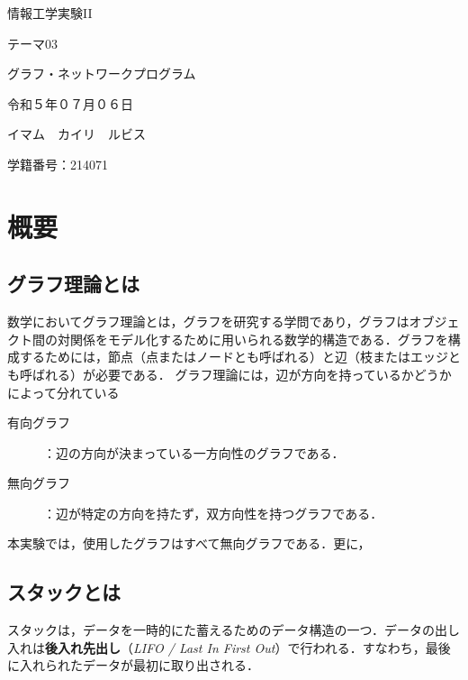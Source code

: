 \documentclass[a4j, titlepage]{jarticle}
\begin{document}
  \begin{center}
  \huge 情報工学実験II\par
  \vspace{15mm}
  \huge テーマ03 \par
  \huge グラフ・ネットワークプログラム \par
  \vspace{15mm}
  \vspace{20mm}
  \vspace{100mm}
  \Large 令和５年０７月０６日 \par
  \vspace{15mm}
  \Large イマム　カイリ　ルビス \par
  \vspace{10mm}
  \Large 学籍番号：214071\par
  \vspace{10mm}
\end{center}
\clearpage

\tableofcontents
\clearpage

\section{概要}
    \subsection{グラフ理論とは}
    数学においてグラフ理論とは，グラフを研究する学問であり，グラフはオブジェクト間の対関係をモデル化するために用いられる数学的構造である．グラフを構成するためには，節点（点またはノードとも呼ばれる）と辺（枝またはエッジとも呼ばれる）が必要である\cite{bib:wikigraph}． 
    グラフ理論には，辺が方向を持っているかどうかによって分れている
    \begin{description}
        \item[有向グラフ]：辺の方向が決まっている一方向性のグラフである．
        \item[無向グラフ]：辺が特定の方向を持たず，双方向性を持つグラフである．
    \end{description}
    本実験では，使用したグラフはすべて無向グラフである．更に，

    \subsection{スタックとは} 
    スタックは，データを一時的にた蓄えるためのデータ構造の一つ．データの出し入れは\textbf{後入れ先出し}（\textit{LIFO / Last In First Out}）で行われる．すなわち，最後に入れられたデータが最初に取り出される\cite{bib:boyoh}．
\end{document}
